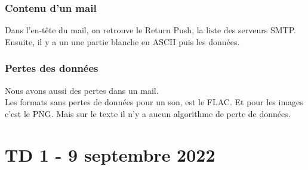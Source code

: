 \documentclass[12pt, a4paper]{article}
\begin{document}
    \subsubsection{Contenu d'un mail}
    Dans l'en-tête du mail, on retrouve le Return Push, la liste des serveurs 
    SMTP. Ensuite, il y a un une partie blanche en ASCII puis les données.
    
    \subsubsection{Pertes des données}
    Nous avons aussi des pertes dans un mail. \\
    Les formats sans pertes de données pour un son, est le FLAC. Et pour les
    images c'est le PNG. Mais sur le texte il n'y a aucun algorithme de perte
    de données. \\
    
\newpage
\section{TD 1 - 9 septembre 2022}
\end{document}
